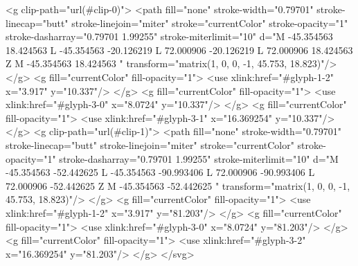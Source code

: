<g clip-path="url(#clip-0)">
<path fill="none" stroke-width="0.79701" stroke-linecap="butt" stroke-linejoin="miter" stroke="currentColor" stroke-opacity="1" stroke-dasharray="0.79701 1.99255" stroke-miterlimit="10" d="M -45.354563 18.424563 L -45.354563 -20.126219 L 72.000906 -20.126219 L 72.000906 18.424563 Z M -45.354563 18.424563 " transform="matrix(1, 0, 0, -1, 45.753, 18.823)"/>
</g>
<g fill="currentColor" fill-opacity="1">
<use xlink:href="#glyph-1-2" x="3.917" y="10.337"/>
</g>
<g fill="currentColor" fill-opacity="1">
<use xlink:href="#glyph-3-0" x="8.0724" y="10.337"/>
</g>
<g fill="currentColor" fill-opacity="1">
<use xlink:href="#glyph-3-1" x="16.369254" y="10.337"/>
</g>
<g clip-path="url(#clip-1)">
<path fill="none" stroke-width="0.79701" stroke-linecap="butt" stroke-linejoin="miter" stroke="currentColor" stroke-opacity="1" stroke-dasharray="0.79701 1.99255" stroke-miterlimit="10" d="M -45.354563 -52.442625 L -45.354563 -90.993406 L 72.000906 -90.993406 L 72.000906 -52.442625 Z M -45.354563 -52.442625 " transform="matrix(1, 0, 0, -1, 45.753, 18.823)"/>
</g>
<g fill="currentColor" fill-opacity="1">
<use xlink:href="#glyph-1-2" x="3.917" y="81.203"/>
</g>
<g fill="currentColor" fill-opacity="1">
<use xlink:href="#glyph-3-0" x="8.0724" y="81.203"/>
</g>
<g fill="currentColor" fill-opacity="1">
<use xlink:href="#glyph-3-2" x="16.369254" y="81.203"/>
</g>
</svg>

